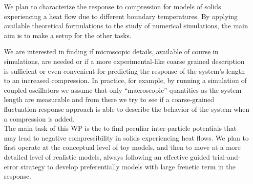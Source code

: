\begin{workpackage}
\begin{wpdescription}
\end{wpdescription}

\begin{tasklist}

  \begin{task}[title=TASK1,id=task1,PM=3,lead=UNIPD,wphases={0-12!1,12-24!0.5}]
 
    We plan to characterize the response to compression
    for models of solids experiencing a heat flow due to different boundary temperatures.
    By applying available theoretical formulations to the study of numerical simulations,
    the main aim is to make a setup for the other tasks.
    
  \end{task}

  \begin{task}[title=TASK2,id=task2,PM=3,lead=UNIPD,partners=KUL,wphases={12-24!0.5,24-36!1}]

    We are interested in finding if microscopic details, available of course in simulations, 
    are needed or if a more experimental-like coarse grained description is sufficient or even convenient for
    predicting the response of the system's length to an increased compression. In practice, for example,
    by running a simulation of coupled oscillators we assume that only ``macroscopic'' quantities as the system length
    are measurable and from there we try to see if a coarse-grained fluctuation-response approach is able to
    describe the behavior of the system when a compression is added.\\
    The main task of this WP is the to
        find peculiar inter-particle potentials that may lead to negative 
        compressibility in solids experiencing heat flows. 
        We plan to first operate at the conceptual level of toy models, and then to move
        at a more detailed level of realistic models, always following an effective guided
        trial-and-error strategy to develop preferentially models with large
        frenetic term in the response.
    
  \end{task}


\end{tasklist}
\end{workpackage}
